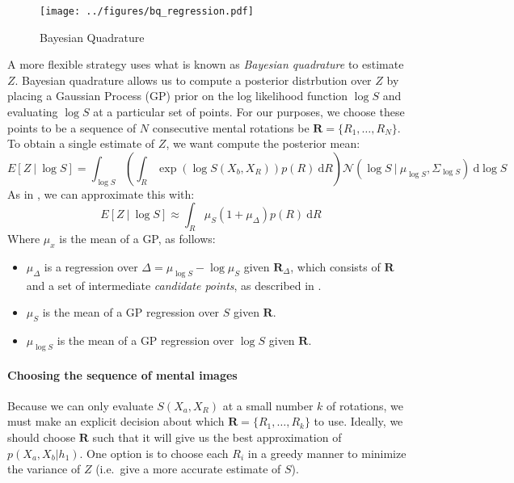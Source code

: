 \documentclass{article} %
\begin{document}
\begin{figure}[t]
  \centering
  \texttt{[image: ../figures/bq\_regression.pdf]}
  \caption{Bayesian Quadrature}
  \label{fig:bq}
\end{figure}

A more flexible strategy uses what is known as \emph{Bayesian
  quadrature} \cite{Diaconis:1988uo,OHagan:1991tx} to estimate $Z$.
Bayesian quadrature allows us to compute a posterior distrbution over
$Z$ by placing a Gaussian Process (GP) \cite{Rasmussen:2006vz} prior
on the log likelihood function $\log S$ and evaluating $\log S$ at a
particular set of points. For our purposes, we choose these points to
be a sequence of $N$ consecutive mental rotations be
$\mathbf{R}=\{R_1, \ldots{}, R_N\}$. To obtain a single estimate of
$Z$, we want compute the posterior mean:
\begin{equation}
  E[Z\ \vert \ \log S]=\int_{\log S}\left(\int_R \exp(\log{S(X_b,X_R)})p(R)\ \mathrm{d}R\right)\mathcal{N}\left(\log{S}\ \vert \ \mu_{\log S}, \Sigma_{\log S}\right)\ \mathrm{d}\log S
\end{equation}
As in \cite{Osborne:2012tm}, we can approximate this with:
\begin{equation}
  E[Z\ \vert \ \log S] \approx \int_R \mu_{S}(1 + \mu_\Delta) p(R)\ \mathrm{d}R
\end{equation} 
Where $\mu_x$ is the mean of a GP, as follows:

\begin{itemize}
\itemsep1pt\parskip0pt
\item $\mu_\Delta$ is a regression over $\Delta=\mu_{\log S} - \log
  \mu_S$ given $\mathbf{R}_\Delta$, which consists of $\mathbf{R}$ and
  a set of intermediate \emph{candidate points}, as described in
  \cite{Osborne:2012tm}.
\item $\mu_S$ is the mean of a GP regression over $S$ given
  $\mathbf{R}$.
\item $\mu_{\log S}$ is the mean of a GP regression over $\log S$
  given $\mathbf{R}$.
\end{itemize}

\paragraph{Choosing the sequence of mental images}

Because we can only evaluate $S(X_a, X_R)$ at a small number $k$ of
rotations, we must make an explicit decision about which
$\mathbf{R}=\{R_1, \ldots{}, R_k\}$ to use. Ideally, we should choose
$\mathbf{R}$ such that it will give us the best approximation of
$p(X_a, X_b\vert h_1)$. One option is to choose each $R_i$ in a greedy
manner to minimize the variance of $Z$ (i.e.~give a more accurate
estimate of $S$).
\end{document}

